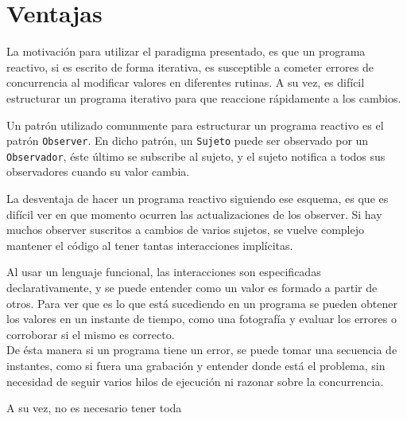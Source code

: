 \section{Ventajas}

  La motivación para utilizar el paradigma presentado, es que un programa reactivo, si es escrito de
forma iterativa, es susceptible a cometer errores de concurrencia al modificar valores en diferentes
rutinas. A su vez, es difícil estructurar un programa iterativo para que reaccione rápidamente a
los cambios.

  Un patrón utilizado comunmente para estructurar un programa reactivo es el patrón \texttt{Observer}.
En dicho patrón, un \texttt{Sujeto} puede ser observado por un \texttt{Observador}, éste último se
subscribe al sujeto, y el sujeto notifica a todos sus observadores cuando su valor cambia.
  
  La desventaja de hacer un programa reactivo siguiendo ese esquema, es que es difícil ver en que
momento ocurren las actualizaciones de los observer. Si hay muchos observer suscritos a cambios
de varios sujetos, se vuelve complejo mantener el código al tener tantas interacciones implícitas.

  Al usar un lenguaje funcional, las interacciones son especificadas declarativamente, y se puede
entender como un valor es formado a partir de otros.
  Para ver que es lo que está sucediendo en un programa se pueden obtener los valores en un instante
de tiempo, como una fotografía y evaluar los errores o corroborar si el mismo es correcto.\\
  De ésta manera si un programa tiene un error, se puede tomar una secuencia de instantes,
como si fuera una grabación y entender donde está el problema,
sin necesidad de seguir varios hilos de ejecución ni razonar sobre la concurrencia.

  A su vez, no es necesario tener toda

